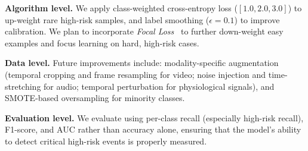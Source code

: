 \documentclass[10pt,twocolumn,letterpaper]{article}
\begin{document}
\noindent\textbf{Algorithm level.} We apply class-weighted cross-entropy loss ($[1.0, 2.0, 3.0]$) to up-weight rare high-risk samples, and label smoothing ($\epsilon{=}0.1$) to improve calibration. We plan to incorporate \emph{Focal Loss}~\cite{lin2017focal} to further down-weight easy examples and focus learning on hard, high-risk cases.

\noindent\textbf{Data level.} Future improvements include: modality-specific augmentation (temporal cropping and frame resampling for video; noise injection and time-stretching for audio; temporal perturbation for physiological signals), and SMOTE-based oversampling for minority classes.

\noindent\textbf{Evaluation level.} We evaluate using per-class recall (especially high-risk recall), F1-score, and AUC rather than accuracy alone, ensuring that the model's ability to detect critical high-risk events is properly measured.

{
    \small
    
    
}
\end{document}
